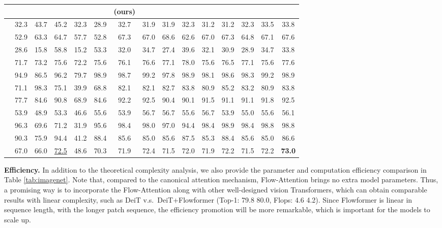 \documentclass[nohyperref]{article}
\theoremstyle{plain}
\theoremstyle{definition}
\theoremstyle{remark}
\begin{document}
\begin{table*}[tb]
\begin{small}
\begin{sc}
\begin{tabular}{l|cccccccccccccc}
				\citeyearpar{kitaev2020reformer} & \citeyearpar{Beltagy2020LongformerTL} & \citeyearpar{performer} &  \citeyearpar{zeng2021yoso} &  \citeyearpar{Lu2021SOFTST} & \citeyearpar{anonymous2022cosformer} & \textbf{(ours)} \\
				\midrule
				\scalebox{0.8}{EthanolConcentration} & 32.3 & 43.7 & 45.2 & 32.3 & 28.9 & 32.7 &31.9& 31.9 & 32.3 & 31.2 &  31.2 & 32.3 & 33.5 & 33.8 \\
				\scalebox{0.8}{FaceDetection} & 52.9  & 63.3 & 64.7& 57.7 & 52.8 & 67.3 & 67.0 & 68.6 & 62.6 & 67.0&  67.3 & 64.8 & 67.1 & 67.6 \\
				\scalebox{0.8}{Handwriting} & 28.6  & 15.8& 58.8 & 15.2 & 53.3 & 32.0 & 34.7 & 27.4 & 39.6 & 32.1 &  30.9 & 28.9 & 34.7 & 33.8 \\
				\scalebox{0.8}{Heartbeat} & 71.7  & 73.2& 75.6 & 72.2 & 75.6 & 76.1 & 76.6& 77.1 & 78.0 & 75.6 & 76.5 & 77.1 & 75.6 & 77.6 \\
				\scalebox{0.8}{JapaneseVowels} & 94.9  & 86.5 & 96.2& 79.7 & 98.9 & 98.7 &99.2& 97.8 &  98.9 & 98.1 & 98.6 & 98.3 & 99.2 & 98.9\\
				\scalebox{0.8}{PEMS-SF} & 71.1  & 98.3& 75.1 & 39.9 & 68.8 & 82.1 &82.1 & 82.7 & 83.8 & 80.9 &  85.2 & 83.2 & 80.9 &  83.8\\
				\scalebox{0.9}{SelfRegulationSCP1} & 77.7  & 84.6& 90.8 & 68.9 & 84.6 & 92.2 &92.5 & 90.4 & 90.1 & 91.5 & 91.1 & 91.1 & 91.8 & 92.5\\
			    \scalebox{0.8}{SelfRegulationSCP2} & 53.9 & 48.9& 53.3  & 46.6 & 55.6 &53.9 & 56.7 & 56.7 & 55.6 & 56.7 & 53.9 & 55.0 & 55.6 & 56.1\\
			    \scalebox{0.8}{SpokenArabicDigits} & 96.3  & 69.6& 71.2 & 31.9 & 95.6 & 98.4 &98.0 & 97.0 & 94.4 & 98.4 & 98.9 & 98.4 & 98.8& 98.8\\
			    \scalebox{0.8}{UWaveGestureLibrary} & 90.3 & 75.9& 94.4 & 41.2 & 88.4 & 85.6 &85.0 & 85.6 & 87.5 & 85.3 &  88.4 & 85.6 & 85.0 & 86.6\\
			    \midrule
			    \scalebox{0.95}{Average Accuracy} & 67.0 & 66.0  & \underline{72.5} &48.6 & 70.3 & 71.9 & 72.4 & 71.5 & 72.0 & 71.9 &  72.2 & 71.5 &72.2 & \textbf{73.0} \\
				\bottomrule
			\end{tabular}
		\end{sc}
	\end{small}
\end{table*}

\textbf{Efficiency.} In addition to the theoretical complexity analysis, we also provide the parameter and computation efficiency comparison in Table \ref{tab:imagenet}. Note that, compared to the canonical attention mechanism, Flow-Attention brings no extra model parameters. Thus, a promising way is to incorporate the Flow-Attention along with other well-designed vision Transformers, which can obtain comparable results with linear complexity, such as DeiT v.s.~DeiT+Flowformer (Top-1: 79.8  80.0, Flops: 4.6  4.2). Since Flowformer is linear in sequence length, with the longer patch sequence, the efficiency promotion will be more remarkable, which is important for the models to scale up.
\end{document}
